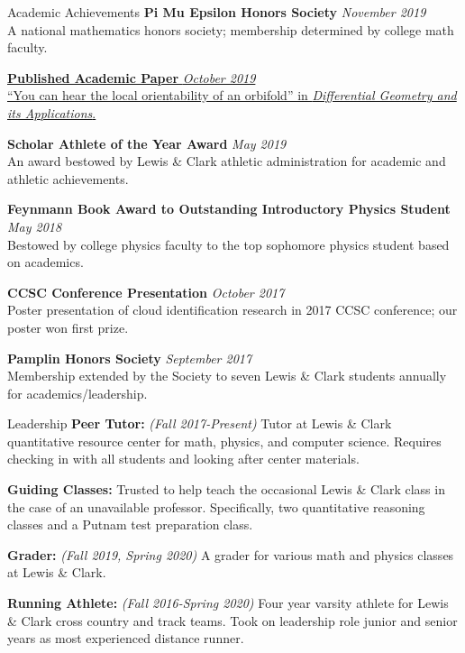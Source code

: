 \documentclass{resume}
\begin{document}
\begin{rSection}{Academic Achievements} 
    \textbf{Pi Mu Epsilon Honors Society} \hfill \textit{November 2019}\\
 A national mathematics honors society; membership determined by college math faculty.

    \href{https://www.sciencedirect.com/science/article/pii/S092622451930097X?utm_campaign=STMJ_75273_AUTH_SERV_PPUB&utm_medium=email&utm_dgroup=Email1Publishing&utm_acid=-800555120&SIS_ID=-1&dgcid=STMJ_75273_AUTH_SERV_PPUB&CMX_ID=&utm_in=DM597592&utm_source=AC_30}
	{\textbf{Published Academic Paper} \hfill \textit{October 2019} \\
``You can hear the local orientability of an orbifold'' in \textit{Differential Geometry and its Applications}.}

    \textbf{Scholar Athlete of the Year Award} \hfill \textit{May 2019}\\ 
An award bestowed by Lewis \& Clark athletic administration for academic and athletic achievements.

    \textbf{Feynmann Book Award to Outstanding Introductory Physics Student}
	\hfill \textit{May 2018}\\
    Bestowed by college physics faculty to the top sophomore physics student based on academics.

    \textbf{CCSC Conference Presentation} \hfill \textit{October 2017}\\
	Poster presentation of cloud identification research in 2017 CCSC conference; our poster won first prize.

    \textbf{Pamplin Honors Society} \hfill \textit{September 2017} \\
 Membership extended by the Society to seven Lewis \& Clark students annually for academics/leadership.

\end{rSection}
\begin{rSection}{Leadership}
    \textbf{Peer Tutor:} \textit{(Fall 2017-Present)}
Tutor at Lewis \& Clark quantitative resource center for math, physics, and computer science. Requires checking in with all students and looking after center materials.

	\textbf{Guiding Classes:} Trusted to help teach the occasional Lewis \& Clark class in the case of an unavailable professor. Specifically, two quantitative reasoning classes and a Putnam test preparation class.

    \textbf{Grader:} \textit{(Fall 2019, Spring 2020)} A grader for various math and physics classes at Lewis \& Clark. 

    \textbf{Running Athlete:} \textit{(Fall 2016-Spring 2020)} Four year varsity athlete for Lewis \& Clark cross country and track teams. Took on leadership role junior and senior years as most experienced distance runner.


\end{rSection}
\end{document}
